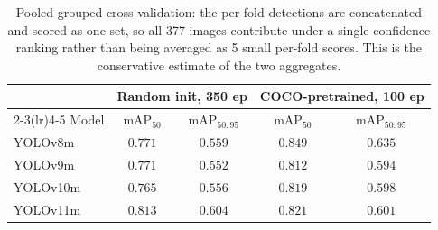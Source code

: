 \begin{table}[t]
\centering\small
\caption{Pooled grouped cross-validation: the per-fold detections are concatenated and scored as one set, so all 377 images contribute under a single confidence ranking rather than being averaged as 5 small per-fold scores. This is the conservative estimate of the two aggregates.}
\label{tab:pooled}
\begin{tabular}{lcccc}
\toprule
& \multicolumn{2}{c}{Random init, 350 ep} & \multicolumn{2}{c}{COCO-pretrained, 100 ep} \\
\cmidrule(lr){2-3}\cmidrule(lr){4-5}
Model & mAP$_{50}$ & mAP$_{50:95}$ & mAP$_{50}$ & mAP$_{50:95}$ \\
\midrule
YOLOv8m & $0.771$ & $0.559$ & $0.849$ & $0.635$ \\
YOLOv9m & $0.771$ & $0.552$ & $0.812$ & $0.594$ \\
YOLOv10m & $0.765$ & $0.556$ & $0.819$ & $0.598$ \\
YOLOv11m & $0.813$ & $0.604$ & $0.821$ & $0.601$ \\
\bottomrule
\end{tabular}
\end{table}
